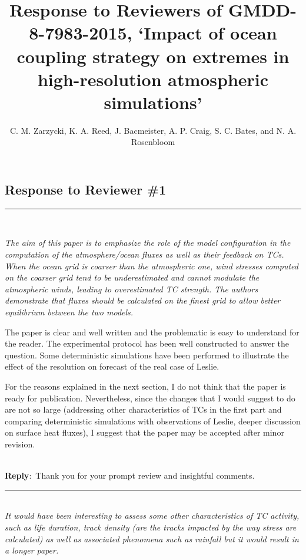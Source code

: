 \documentclass{article}
\newcommand{\genDisc}[1]{\medskip \hrule \noindent \\
               {\itshape #1}}
\newcommand{\reply}{\noindent \\ \textbf{Reply}:\ }
\begin{document}
\title{Response to Reviewers of GMDD-8-7983-2015, `Impact of ocean coupling strategy on extremes in high-resolution atmospheric simulations'}
\author{C. M. Zarzycki, K. A. Reed, J. Bacmeister, A. P. Craig, S. C. Bates, and N. A. Rosenbloom}

\maketitle

\subsection*{Response to Reviewer \#1}

\genDisc{The aim of this paper is to emphasize the role of the model configuration in the computation of the atmosphere/ocean fluxes as well as their feedback on TCs. When the ocean grid is coarser than the atmospheric one, wind stresses computed on the coarser grid tend to be underestimated and cannot modulate the atmospheric winds, leading to overestimated TC strength. The authors demonstrate that fluxes should be calculated on the finest grid to allow better equilibrium between the two models.

The paper is clear and well written and the problematic is easy to understand for the reader. The experimental protocol has been well constructed to answer the question. Some deterministic simulations have been performed to illustrate the effect of the resolution on forecast of the real case of Leslie.

For the reasons explained in the next section, I do not think that the paper is ready for publication. Nevertheless, since the changes that I would suggest to do are not so large (addressing other characteristics of TCs in the first part and comparing deterministic simulations with observations of Leslie, deeper discussion on surface heat fluxes), I suggest that the paper may be accepted after minor revision.}

\reply{Thank you for your prompt review and insightful comments.}

\genDisc{It would have been interesting to assess some other characteristics of TC activity, such as life duration, track density (are the tracks impacted by the way stress are calculated) as well as associated phenomena such as rainfall but it would result in a longer paper.}
\end{document}
